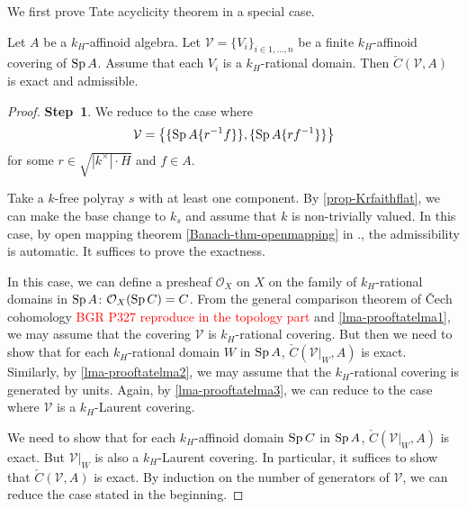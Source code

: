 We first prove Tate acyclicity theorem in a special case.
\begin{lemma}\label{lma-tateacyc1}
    Let $A$ be a $k_H$-affinoid algebra. Let $\mathcal{V}=\{V_i\}_{i\in 1,\ldots,n}$ be a finite $k_H$-affinoid covering of $\operatorname{Sp} A$. Assume that each $V_i$ is a $k_H$-rational domain. Then $\check{C}(\mathcal{V},A)$ is exact and admissible.
\end{lemma}
\begin{proof}
    \textbf{Step~1}. We reduce to the case where
    \[
        \mathcal{V}=\left\{\{\operatorname{Sp} A\{r^{-1}f\}\},\{\operatorname{Sp} A\{rf^{-1}\}\}\right\}
    \]
    for some $r\in \sqrt{|k^{\times}|\cdot H}$ and $f\in A$.


    Take a $k$-free polyray $s$ with at least one component. By \cref{prop-Krfaithflat}, we can make the base change to $k_s$ and assume that $k$ is non-trivially valued. In this case, by open mapping theorem \cref{Banach-thm-openmapping} in ., the admissibility is automatic. It suffices to prove the exactness.

    In this case, we can define a presheaf $\mathcal{O}_X$ on $X$ on the family of $k_H$-rational domains in $\operatorname{Sp} A$:  $\mathcal{O}_X(\operatorname{Sp} C)=C$. From the general comparison theorem of \v{C}ech cohomology \textcolor{red}{BGR P327 reproduce in the topology part} and \cref{lma-prooftatelma1}, we may assume that the covering $\mathcal{V}$ is  $k_H$-rational covering. But then we need to show that for each $k_H$-rational domain $W$ in $\operatorname{Sp} A$, $\check{C}(\mathcal{V}|_W,A)$ is exact. Similarly, by \cref{lma-prooftatelma2}, we may assume that the $k_H$-rational covering is generated by units. Again, by \cref{lma-prooftatelma3}, we can reduce to the case where $\mathcal{V}$ is a $k_H$-Laurent covering.

    We need to show that for each $k_H$-affinoid domain $\operatorname{Sp} C$ in $\operatorname{Sp} A$, $\check{C}(\mathcal{V}|_W,A)$ is exact. But $\mathcal{V}|_W$ is also a $k_H$-Laurent covering. In particular, it suffices to show that $\check{C}(\mathcal{V},A)$ is exact. By induction on the number of generators of $\mathcal{V}$, we can reduce the case stated in the beginning.
    

\end{proof}
